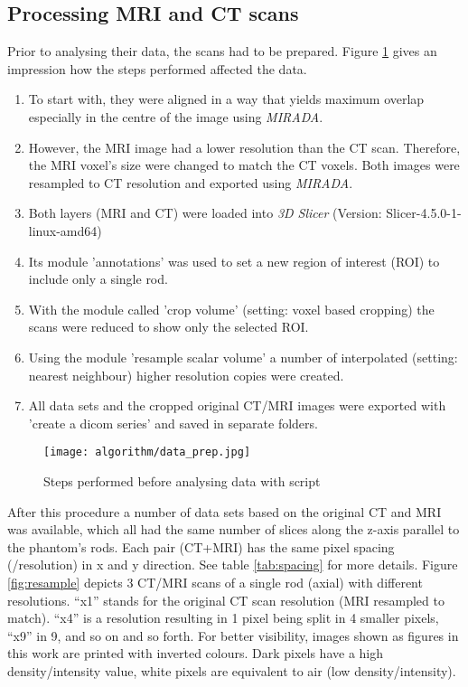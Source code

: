 \subsection{Processing MRI and CT scans}

Prior to analysing their data, the scans had to be prepared.
Figure \ref{fig:data_prep} gives an impression how the steps performed affected the data.

\begin{enumerate}[label=\textbf{Step \arabic*}]
\item To start with, they were aligned in a way that yields maximum overlap especially in the centre of the image using \textit{MIRADA}.
\item However, the MRI image had a lower resolution than the CT scan.
Therefore, the MRI voxel's size were changed to match the CT voxels. Both images were resampled to CT resolution and exported using \textit{MIRADA}.
\item Both layers (MRI and CT) were loaded into \textit{3D Slicer} (Version: Slicer-4.5.0-1-linux-amd64)
\item Its module 'annotations' was used to set a new region of interest (ROI) to include only a single rod.
\item With the module called 'crop volume' (setting: voxel based cropping) the scans were reduced to show only the selected ROI.
\item Using the module 'resample scalar volume' a number of interpolated (setting: nearest neighbour) higher resolution copies were created.
\item All data sets and the cropped original CT/MRI images were exported with 'create a dicom series' and saved in separate folders.
\end{enumerate}

\begin{figure}[!tbp]
\centering
\texttt{[image: algorithm/data\_prep.jpg]}
\caption{Steps performed before analysing data with script}
\label{fig:data_prep}
\end{figure}

After this procedure a number of data sets based on the original CT and MRI was available, which all had the same number of slices along the z-axis parallel to the phantom's rods.
Each pair (CT+MRI) has the same pixel spacing (/resolution) in x and y direction.
See table \ref{tab:spacing} for more details.
Figure \ref{fig:resample} depicts 3 CT/MRI scans of a single rod (axial) with different resolutions.
``x1'' stands for the original CT scan resolution (MRI resampled to match).
``x4'' is a resolution resulting in 1 pixel being split in 4 smaller pixels, ``x9'' in 9, and so on and so forth.
For better visibility, images shown as figures in this work are printed with inverted colours.
Dark pixels have a high density/intensity value, white pixels are equivalent to air (low density/intensity).

